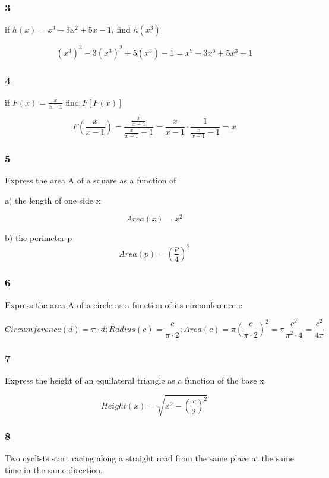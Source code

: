 \documentclass[]{report}
\begin{document}
\subsubsection{3}
if $h(x) = x^3 - 3x^2 + 5x - 1$, find $h(x^3)$

\[
(x^3)^3 - 3(x^3)^2 + 5(x^3) - 1 = x^9 - 3x^6 + 5x^3 - 1
\]

\subsubsection{4}

if $F(x) = \frac{x}{x-1}$ find $F[F(x)]$


\[
F(\frac{x}{x-1}) = \frac{\frac{x}{x-1}}{\frac{x}{x-1}-1} = \frac{x}{x-1} \cdot \frac{1}{\frac{x}{x-1}-1} =  x
\]

\subsubsection{5}

Express the area A of a square as a function of 

a) the length of one side x

\[
Area(x) = x^2
\]

b) the perimeter p
\[
Area(p) = (\frac{p}{4})^2
\]

\subsubsection{6}

Express the area A of a circle as a function of its circumference c

\[
Circumference(d) = \pi \cdot d;
Radius(c) = \frac{c}{\pi \cdot 2};
Area(c) = \pi (\frac{c}{\pi \cdot 2})^2 = \pi \frac{c^2}{\pi^2 \cdot 4} = \frac{c^2}{4\pi}
\]

\subsubsection{7} 
Express the height of an equilateral triangle as a function of the base x

\[
Height(x) = \sqrt{x^2 - (\frac{x}{2})^2}
\]

\subsubsection{8}
Two cyclists start racing along a straight road from the same place at the same time in the same direction.
\end{document}
